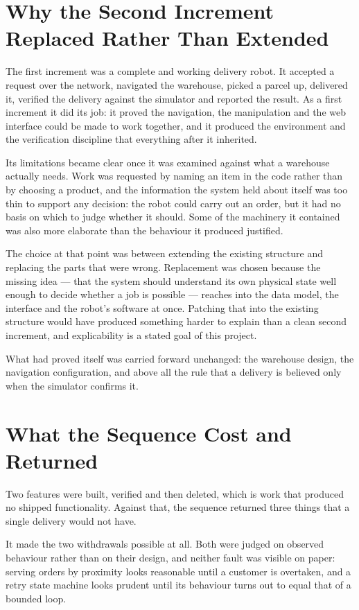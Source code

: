 \documentclass[12pt,a4paper]{report}
\begin{document}
\section{Why the Second Increment Replaced Rather Than Extended}
The first increment was a complete and working delivery robot. It accepted a request over the
network, navigated the warehouse, picked a parcel up, delivered it, verified the delivery against
the simulator and reported the result. As a first increment it did its job: it proved the
navigation, the manipulation and the web interface could be made to work together, and it produced
the environment and the verification discipline that everything after it inherited.

Its limitations became clear once it was examined against what a warehouse actually needs. Work was
requested by naming an item in the code rather than by choosing a product, and the information the
system held about itself was too thin to support any decision: the robot could carry out an order,
but it had no basis on which to judge whether it should. Some of the machinery it contained was also
more elaborate than the behaviour it produced justified.

The choice at that point was between extending the existing structure and replacing the parts that
were wrong. Replacement was chosen because the missing idea --- that the system should understand
its own physical state well enough to decide whether a job is possible --- reaches into the data
model, the interface and the robot's software at once. Patching that into the existing structure
would have produced something harder to explain than a clean second increment, and explicability is
a stated goal of this project.

What had proved itself was carried forward unchanged: the warehouse design, the navigation
configuration, and above all the rule that a delivery is believed only when the simulator confirms
it.

\section{What the Sequence Cost and Returned}
Two features were built, verified and then deleted, which is work that produced no shipped
functionality. Against that, the sequence returned three things that a single delivery would not
have.

It made the two withdrawals possible at all. Both were judged on observed behaviour rather than on
their design, and neither fault was visible on paper: serving orders by proximity looks reasonable
until a customer is overtaken, and a retry state machine looks prudent until its behaviour turns out
to equal that of a bounded loop.
\end{document}
